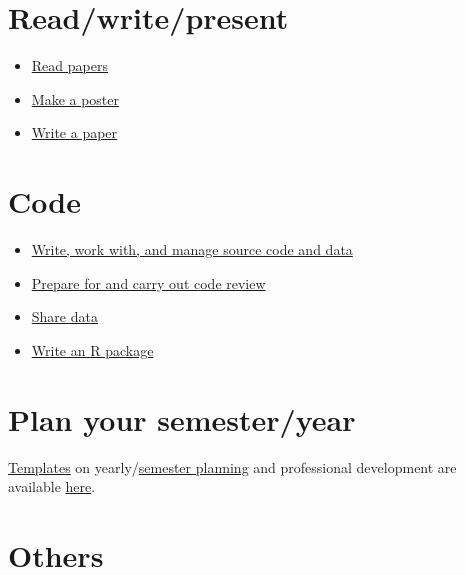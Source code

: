 \documentclass[
  letterpaper,
  DIV=11,
  numbers=noendperiod]{scrreprt}
\providecommand{\tightlist}{%
  \setlength{\itemsep}{0pt}\setlength{\parskip}{0pt}}\usepackage{longtable,booktabs,array}
\begin{document}
\hypertarget{readwritepresent}{%
\section{Read/write/present}\label{readwritepresent}}

\begin{itemize}
\tightlist
\item
  \href{https://github.com/JRaviLab/readingpapers}{Read papers}
\item
  \href{https://github.com/JRaviLab/group/blob/master/docs/howto_make_a_poster.md}{Make
  a poster}
\item
  \href{https://github.com/JRaviLab/group/blob/master/docs/howto_write_a_paper.md}{Write
  a paper}
\end{itemize}

\hypertarget{code}{%
\section{Code}\label{code}}

\begin{itemize}
\tightlist
\item
  \href{https://github.com/JRaviLab/group/blob/master/docs/howto_write_source_code.md}{Write,
  work with, and manage source code and data}
\item
  \href{https://github.com/JRaviLab/group/blob/master/docs/howto_do_code_review.md}{Prepare
  for and carry out code review}
\item
  \href{https://github.com/jtleek/datasharing}{Share data}
\item
  \href{https://github.com/jtleek/rpackages}{Write an R package}
\end{itemize}

\hypertarget{plan-your-semesteryear}{%
\section{Plan your semester/year}\label{plan-your-semesteryear}}

\href{https://github.com/JRaviLab/group/tree/master/docs/templates}{Templates}
on
yearly/\href{https://github.com/JRaviLab/group/blob/master/docs/Yearly-Planning-Document.pdf}{semester
planning} and professional development are available
\href{https://github.com/JRaviLab/group/tree/master/docs}{here}.

\hypertarget{others}{%
\section{Others}\label{others}}
\end{document}
